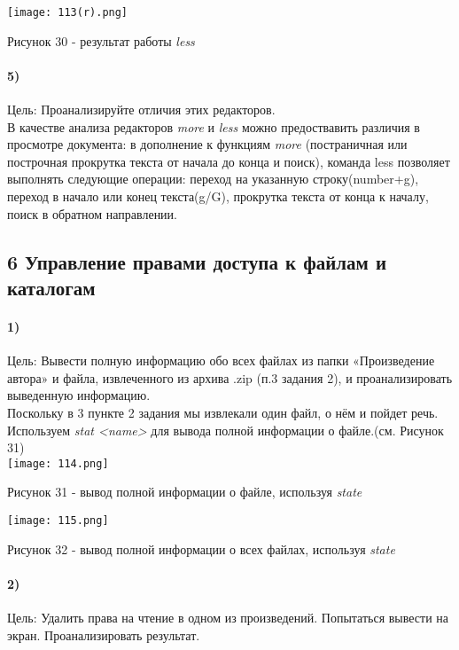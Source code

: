 	\begin{center}
		\texttt{[image: 113(r).png]}\\
			\centerline{ Рисунок 30 - результат работы \textit{less}}

	\end{center}
	
		\paragraph{5)}
		Цель: Проанализируйте отличия этих редакторов.\\

		В качестве анализа редакторов \textit{more} и \textit{less} можно 				предоствавить различия в просмотре документа: в дополнение к функциям 				\textit{more}  (постраничная или построчная прокрутка текста от начала до конца 	и поиск), команда less позволяет выполнять следующие операции: переход на 			указанную строку(number+g), переход в начало или  конец текста(g/G), прокрутка 		текста от конца к началу, поиск в обратном направлении.\\
		
	\subsection*{6 Управление правами доступа к файлам и каталогам}
	
		\paragraph{1)}
		Цель: Вывести полную информацию обо всех файлах из папки «Произведение автора» и файла, извлеченного из архива .zip (п.3 задания 2), и проанализировать выведенную информацию.\\
		
		Поскольку в 3 пункте 2 задания мы извлекали один файл, о нём и пойдет речь. 	Используем \textit{stat <name>} для вывода полной информации о файле.(см. Рисунок 31) \\
	\texttt{[image: 114.png]}\\
		\centerline{Рисунок 31 - вывод полной информации о файле, используя \textit{state}}

	\texttt{[image: 115.png]}\\
		\centerline{Рисунок 32 - вывод полной информации о всех файлах, используя \textit{state}}

		\paragraph{2)}
		Цель: Удалить права на чтение в одном из произведений. Попытаться вывести на экран. 
		Проанализировать результат.\\

